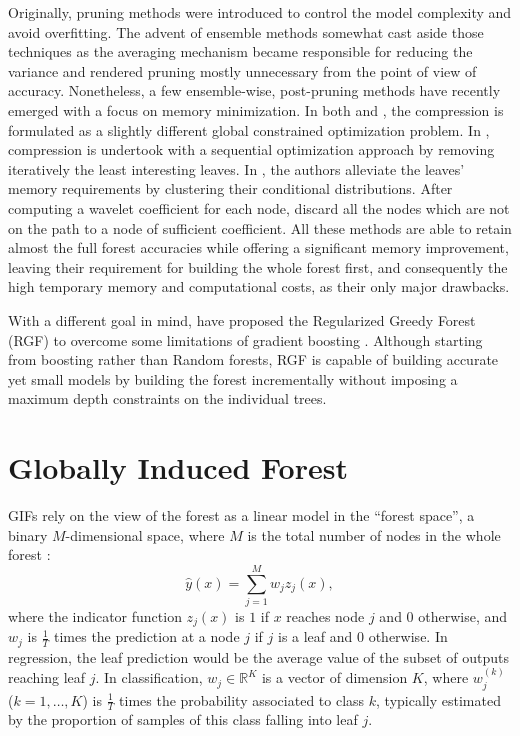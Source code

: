 \documentclass{article}
\begin{document}
Originally, pruning methods were introduced to control the model complexity and
avoid overfitting. The advent of ensemble methods somewhat cast aside those
techniques as the averaging mechanism became responsible for reducing the
variance and rendered pruning mostly unnecessary from the point of view of
accuracy. Nonetheless, a few ensemble-wise, post-pruning methods have recently
emerged with a focus on memory minimization. In both
\cite{meinshausen2009forestgarrote} and \cite{l1basedcomp}, the compression is
formulated as a slightly different global constrained optimization problem.  In
\cite{ren2015glorefinement}, compression is undertook with a sequential
optimization approach by removing iteratively the least interesting leaves.  In
\cite{vleeschouwer2015mitimemreq}, the authors alleviate the leaves' memory
requirements by clustering their conditional distributions. After computing a
wavelet coefficient for each node, \citet{elisha2016wavelet} discard all the
nodes which are not on the path to a node of sufficient coefficient.  All these
methods are able to retain almost the full forest accuracies while offering a
significant memory improvement, leaving their requirement for building the whole
forest first, and consequently the high temporary memory and computational
costs, as their only major drawbacks.

With a different goal in mind, \citet{johnson2014regforest} have proposed the 
Regularized Greedy Forest (RGF) to overcome some limitations of gradient 
boosting \cite{friedman2001gradboost}. Although starting from boosting rather 
than Random forests, RGF is capable of building accurate yet small models by 
building the forest incrementally without imposing a maximum depth constraints 
on the individual trees.

\section{Globally Induced Forest}
\label{sec:gif}

GIFs rely on the view of the forest as a linear model in the ``forest space'', 
a binary $M$-dimensional space, where $M$ is the total number of nodes in the 
whole forest \cite{l1basedcomp,vens2011random}:
%
\begin{equation}\label{eq:fs}
\hat{y}(x) =   \sum_{j=1}^{M} w_j z_j(x),
\end{equation}
where the indicator function $z_j(x)$ is $1$ if $x$ reaches node $j$ and $0$
otherwise, and $w_j$ is $\frac{1}{T}$ times the prediction at a node $j$ if $j$ 
is a leaf and $0$ otherwise. In regression, the leaf prediction would be the 
average value of the subset of outputs reaching leaf $j$. In classification, 
$w_j \in \mathbb{R}^K$ is a vector of dimension $K$, where $w_j^{(k)}$ 
($k=1,\ldots,K$) is $\frac{1}{T}$ times the probability associated to class 
$k$, typically estimated by the proportion of samples of this class falling 
into leaf $j$.
\end{document}
